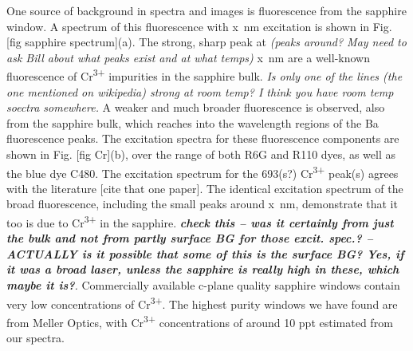 One source of background in spectra and images is fluorescence from the sapphire window.  A spectrum of this fluorescence with x~nm excitation is shown in Fig. [fig sapphire spectrum](a).  The strong, sharp peak at \emph{\color{gray}(peaks around? May need to ask Bill about what peaks exist and at what temps)} x~nm are a well-known fluorescence of Cr\textsuperscript{3+} impurities in the sapphire bulk.  \emph{\color{gray}Is only one of the lines (the one mentioned on wikipedia) strong at room temp?  I think you have room temp soectra somewhere.}  A weaker and much broader fluorescence is observed, also from the sapphire bulk, which reaches into the wavelength regions of the Ba fluorescence peaks.  The excitation spectra for these fluorescence components are shown in Fig. [fig Cr](b), over the range of both R6G and R110 dyes, as well as the blue dye C480.  The excitation spectrum for the {\color{red}693(s?)} Cr\textsuperscript{3+} peak{\color{red}(s)} agrees with the literature [cite that one paper].  The identical excitation spectrum of the broad fluorescence, including the small peaks around x~nm, demonstrate that it too is due to Cr\textsuperscript{3+} in the sapphire.  \emph{\color{gray}\textbf{check this -- was it certainly from just the bulk and not from partly surface BG for those excit. spec.? -- ACTUALLY is it possible that some of this is the surface BG?  Yes, if it was a broad laser, unless the sapphire is really high in these, which maybe it is?}.}  Commercially available c-plane quality sapphire windows contain very low concentrations of Cr\textsuperscript{3+}.  The highest purity windows we have found are from Meller Optics, with Cr\textsuperscript{3+} concentrations of around {\color{red}10 ppt} estimated from our spectra.

